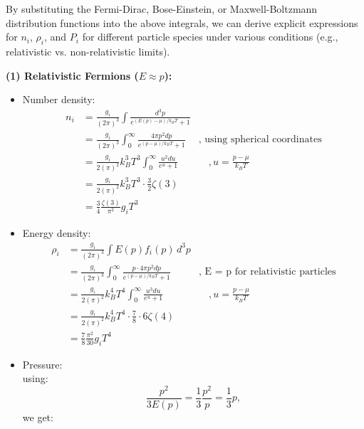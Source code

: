 \bigskip\noindent
By substituting the Fermi-Dirac, Bose-Einstein, or Maxwell-Boltzmann distribution functions into the above integrals, we can derive explicit expressions for $n_i$, $\rho_i$, and $P_i$ for different particle species under various conditions (e.g., relativistic vs. non-relativistic limits).

\clearpage
\begin{foundation}
    \textbf{(1) Relativistic Fermions ($E \approx p$):}
     \begin{itemize}
        \item Number density: 
        \begin{align*}
            n_i &= \frac{g_i}{(2\pi)^3} \int \frac{d^3p}{e^{(E(p) - \mu)/k_B T} + 1}\\
                &= \frac{g_i}{(2\pi)^3} \int_0^\infty \frac{4 \pi p^2 dp}{e^{(p - \mu)/k_B T} + 1} &
                \text{, using spherical coordinates}\\ 
                &= \frac{g_i}{2(\pi)^2} k_B^3 T^3 \int_0^\infty \frac{u^2 du}{e^{u} + 1} & \quad , u = \frac{p - \mu}{k_B T} \\
                &= \frac{g_i}{2(\pi)^2} k_B^3 T^3 \cdot \frac{3}{2} \zeta(3) & \\
                &= \frac{3}{4}\frac{\zeta(3)}{\pi^2} g_i T^3
        \end{align*}
        \item Energy density: 
        \begin{align*}
            \rho_i &= \frac{g_i}{(2\pi)^3} \int E(p) f_i(p) \, d^3p \\
                    &= \frac{g_i}{(2\pi)^3} \int_0^\infty \frac{p \cdot 4 \pi p^2 dp}{e^{(p - \mu)/k_B T} + 1} & \text{, E = p for relativistic particles} \\
                    &= \frac{g_i}{2(\pi)^2} k_B^4 T^4 \int_0^\infty \frac{u^3 du}{e^{u} + 1} & \quad , u = \frac{p - \mu}{k_B T} \\
                    &= \frac{g_i}{2(\pi)^2} k_B^4 T^4 \cdot \frac{7}{8} \cdot 6 \zeta(4) & \\
                    &= \frac{7}{8}\frac{\pi^2}{30} g_i T^4
        \end{align*}
        \item Pressure: \\
        using:
        \[
            \frac{p^2}{3E(p)} = \frac{1}{3} \frac{p^2}{p} = \frac{1}{3} p,
        \]
        we get:
        \begin{align*}

\end{align*}
\end{itemize}
\end{foundation}
